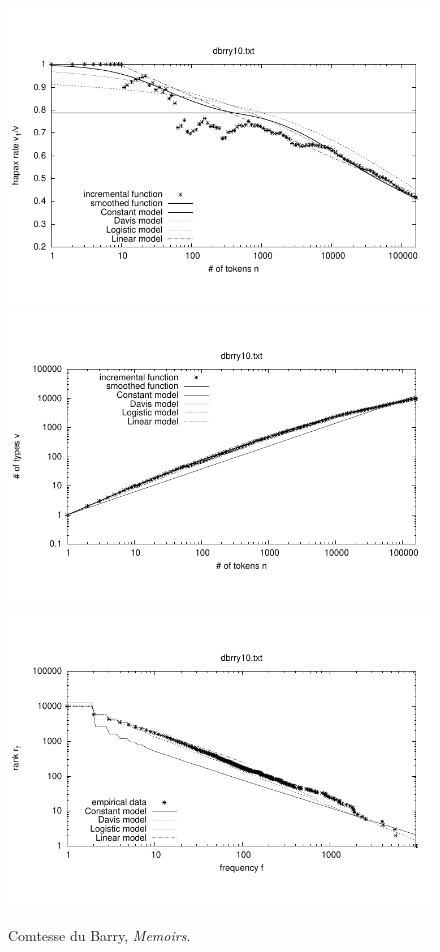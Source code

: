 \documentclass[a4paper,12pt]{article}
\begin{document}

\begin{figure}[p]
  \centering
  \vspace{-2em}
  \includegraphics[width=0.8\columnwidth]{output/herdan/dbrry10_27/token_ratio.pdf}
  \\[-3em]
  \includegraphics[width=0.8\columnwidth]{output/herdan/dbrry10_27/token_type.pdf}
  \\[-3em]
  \includegraphics[width=0.8\columnwidth]{output/herdan/dbrry10_27/frequency_rank.pdf}
  \vspace{-2em}
  \caption{Comtesse du Barry, \emph{Memoirs}.\label{figdbrry10F}}
\end{figure}
\end{document}
